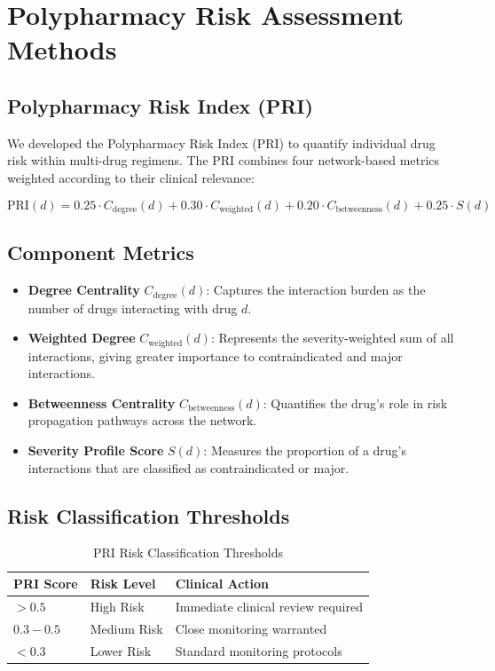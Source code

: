 \documentclass[11pt,a4paper]{article}
\begin{document}
\section*{Polypharmacy Risk Assessment Methods}

\subsection*{Polypharmacy Risk Index (PRI)}

We developed the Polypharmacy Risk Index (PRI) to quantify individual drug risk within multi-drug regimens. The PRI combines four network-based metrics weighted according to their clinical relevance:

\begin{equation}
\text{PRI}(d) = 0.25 \cdot C_{\text{degree}}(d) + 0.30 \cdot C_{\text{weighted}}(d) + 0.20 \cdot C_{\text{betweenness}}(d) + 0.25 \cdot S(d)
\end{equation}

\subsection*{Component Metrics}

\begin{itemize}
    \item \textbf{Degree Centrality} $C_{\text{degree}}(d)$: Captures the interaction burden as the number of drugs interacting with drug $d$.
    \item \textbf{Weighted Degree} $C_{\text{weighted}}(d)$: Represents the severity-weighted sum of all interactions, giving greater importance to contraindicated and major interactions.
    \item \textbf{Betweenness Centrality} $C_{\text{betweenness}}(d)$: Quantifies the drug's role in risk propagation pathways across the network.
    \item \textbf{Severity Profile Score} $S(d)$: Measures the proportion of a drug's interactions that are classified as contraindicated or major.
\end{itemize}

\subsection*{Risk Classification Thresholds}

\begin{table}[H]
\centering
\caption{PRI Risk Classification Thresholds}
\label{tab:pri_thresholds}
\begin{tabular}{lll}
\toprule
\textbf{PRI Score} & \textbf{Risk Level} & \textbf{Clinical Action} \\
\midrule
$> 0.5$ & High Risk & Immediate clinical review required \\
$0.3 - 0.5$ & Medium Risk & Close monitoring warranted \\
$< 0.3$ & Lower Risk & Standard monitoring protocols \\
\bottomrule
\end{tabular}
\end{table}
\end{document}
